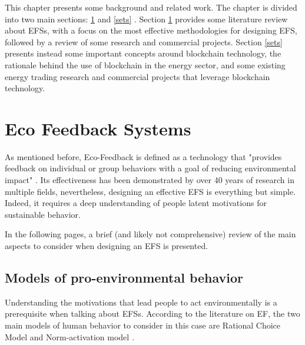 \cleardoublepage
\label{chap:back}

This chapter presents some background and related work. The chapter is divided into two main sections: \ref{sefs}  and \ref{sets} . Section \ref{sefs}  provides some literature review about \acp{EFS}, with a focus on the most effective methodologies for designing \ac{EFS}, followed by a review of some research and commercial projects. Section \ref{sets} presents instead some important concepts around blockchain technology, the rationale behind the use of blockchain in the energy sector, and some existing energy trading research and commercial projects that leverage blockchain technology.


\section{Eco Feedback Systems} \label{sefs}

As mentioned before, Eco-Feedback is defined as a technology that "provides feedback on individual or group behaviors with a goal of reducing environmental impact" \cite{Froehlich2010}. Its effectiveness has been demonstrated by over 40 years of research in multiple fields, nevertheless, designing an effective \ac{EFS} is everything but simple. Indeed, it requires a deep understanding of people latent motivations for sustainable behavior.


In the following pages, a brief (and likely not comprehensive) review of the main aspects to consider when designing an \ac{EFS} is presented.


\subsection{Models of pro-environmental behavior}

Understanding the motivations that lead people to act environmentally is a prerequisite when talking about \acp{EFS}. According to the literature on \ac{EF}, the two main models of human behavior to consider in this case are Rational Choice Model and Norm-activation model \cite{Froehlich2010}.


